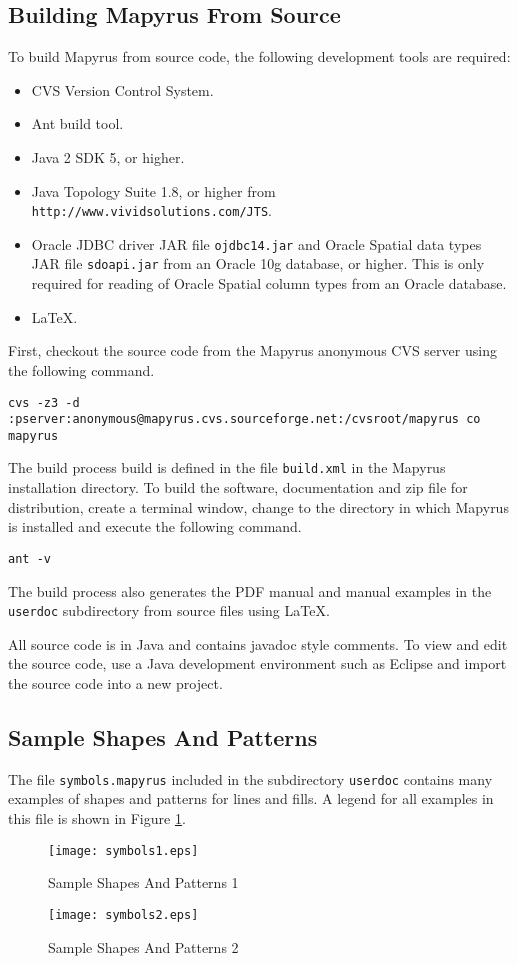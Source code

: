 \subsection{Building Mapyrus From Source}

To build Mapyrus from source code, the following development tools
are required:

\begin{itemize}
\item
CVS Version Control System.
\item
Ant build tool.
\item
Java 2 SDK 5, or higher.
\item
Java Topology Suite 1.8, or higher from \texttt{http://www.vividsolutions.com/JTS}.
\item
Oracle JDBC driver JAR file \texttt{ojdbc14.jar} and Oracle
Spatial data types JAR file \texttt{sdoapi.jar} from an
Oracle 10g database, or higher.  This is only required for reading
of Oracle Spatial column types from an Oracle database.
\item
\LaTeX.
\end{itemize}

First, checkout the source code from the Mapyrus anonymous CVS server
using the following command.

\begin{verbatim}
cvs -z3 -d :pserver:anonymous@mapyrus.cvs.sourceforge.net:/cvsroot/mapyrus co mapyrus
\end{verbatim}

The build process build is defined in the file \texttt{build.xml} in the
Mapyrus installation directory.  To build the software, documentation and zip
file for distribution, create a terminal window, change to the directory in
which Mapyrus is installed and execute the following command.

\begin{verbatim}
ant -v
\end{verbatim}

The build process also generates the PDF manual and manual examples in the
\texttt{userdoc} subdirectory from source files using \LaTeX.

All source code is in Java and contains javadoc style comments.  To view and
edit the source code, use a Java development environment such as Eclipse and
import the source code into a new project.


\subsection{Sample Shapes And Patterns}
The file \texttt{symbols.mapyrus} included in the subdirectory
\texttt{userdoc} contains many examples of shapes and patterns
for lines and fills.  A legend for all examples in this file is shown
in Figure \ref{samplesymbols}.

\begin{figure}[htb]
\label{samplesymbols}
\texttt{[image: symbols1.eps]}
\caption{Sample Shapes And Patterns 1}
\end{figure}

\begin{figure}[htb]
\texttt{[image: symbols2.eps]}
\caption{Sample Shapes And Patterns 2}
\end{figure}

